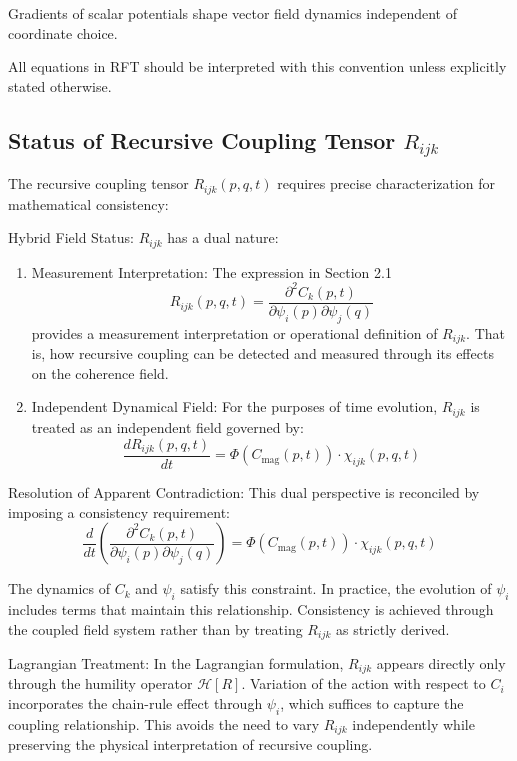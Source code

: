 Gradients of scalar potentials shape vector field dynamics independent of coordinate choice.

All equations in RFT should be interpreted with this convention unless explicitly stated otherwise.

\subsection{Status of Recursive Coupling Tensor \(R_{ijk}\)}

The recursive coupling tensor \(R_{ijk}(p,q,t)\) requires precise characterization for mathematical consistency:

Hybrid Field Status:
\(R_{ijk}\) has a dual nature:
\begin{enumerate}
    \item Measurement Interpretation: The expression in Section 2.1
    \begin{equation}
    R_{ijk}(p, q, t) = \frac{\partial^2 C_k(p,t)}{\partial \psi_i(p) \partial \psi_j(q)}
    \end{equation}
    provides a measurement interpretation or operational definition of \(R_{ijk}\). That is, how recursive coupling can be detected and measured through its effects on the coherence field.
    \item Independent Dynamical Field: For the purposes of time evolution, \(R_{ijk}\) is treated as an independent field governed by:
    \begin{equation}
    \frac{dR_{ijk}(p,q,t)}{dt} = \Phi(C_{\mathrm{mag}}(p,t)) \cdot \chi_{ijk}(p,q,t)
    \end{equation}
\end{enumerate}

Resolution of Apparent Contradiction:
This dual perspective is reconciled by imposing a consistency requirement:
\begin{equation}
\frac{d}{dt}\left(\frac{\partial^2 C_k(p,t)}{\partial \psi_i(p) \partial \psi_j(q)}\right) = \Phi(C_{\mathrm{mag}}(p,t)) \cdot \chi_{ijk}(p,q,t)
\end{equation}

The dynamics of \(C_k\) and \(\psi_i\) satisfy this constraint. In practice, the evolution of \(\psi_i\) includes terms that maintain this relationship. Consistency is achieved through the coupled field system rather than by treating \(R_{ijk}\) as strictly derived.

Lagrangian Treatment:
In the Lagrangian formulation, \(R_{ijk}\) appears directly only through the humility operator \(\mathcal{H}[R]\). Variation of the action with respect to \(C_i\) incorporates the chain-rule effect through \(\psi_i\), which suffices to capture the coupling relationship. This avoids the need to vary \(R_{ijk}\) independently while preserving the physical interpretation of recursive coupling. 